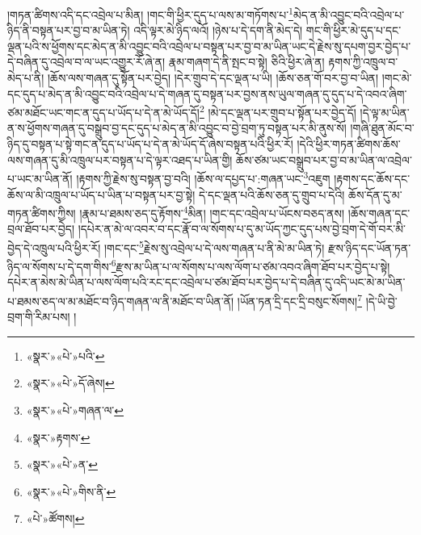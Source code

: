 །གཏན་ཚིགས་འདི་དང་འབྲེལ་པ་མིན། །གང་གི་ཕྱིར་དུད་པ་ལས་མ་གཏོགས་པ་\footnote{«སྣར་»«པེ་»པའི་}མེད་ན་མི་འབྱུང་བའི་འབྲེལ་པ་ཉིད་ནི་བསྟན་པར་བྱ་བ་མ་ཡིན་ཏེ། འདི་ལྟར་མེ་ཉིད་ལའོ། །ཉེས་པ་དེ་དག་ནི་མེད་དེ། གང་གི་ཕྱིར་མེ་དུད་པ་དང་ལྡན་པའི་ས་ཕྱོགས་དང་མེད་ན་མི་འབྱུང་བའི་འབྲེལ་པ་བསྟན་པར་བྱ་བ་མ་ཡིན་ཡང་དེ་རྗེས་སུ་དཔག་བྱར་བྱེད་པ་དེ་བཞིན་དུ་འབྲེལ་བ་ལ་ཡང་འགྱུར་རོ་ཞེ་ན། རྣམ་གཞག་དེ་ནི་སྤང་བ་སྟེ། ཅིའི་ཕྱིར་ཞེ་ན། རྟགས་ཀྱི་འཁྲུལ་བ་མེད་པ་ནི། །ཆོས་ལས་གཞན་དུ་སྟོན་པར་བྱེད། །དེར་གྲུབ་དེ་དང་ལྡན་པ་ཡི། །ཆོས་ཅན་གོ་བར་བྱ་བ་ཡིན། །གང་མེ་དང་དུད་པ་མེད་ན་མི་འབྱུང་བའི་འབྲེལ་པ་དེ་གཞན་དུ་བསྟན་པར་བྱས་ནས་ཡུལ་གཞན་དུ་དུད་པ་དེ་འབའ་ཞིག་ཙམ་མཐོང་ཡང་གང་ན་དུད་པ་ཡོད་པ་དེ་ན་མེ་ཡོད་དོ།\footnote{«སྣར་»«པེ་»དོ་ཞེས།} །མེ་དང་ལྡན་པར་གྲུབ་པ་སྟོན་པར་བྱེད་དོ། །དེ་ལྟ་མ་ཡིན་ན་ས་ཕྱོགས་གཞན་དུ་བསྒྲུབ་བྱ་དང་དུད་པ་མེད་ན་མི་འབྱུང་བ་བྱེ་བྲག་ཏུ་བསྟན་པར་མི་ནུས་སོ། །གཞི་ཐུན་མོང་བ་ཉིད་དུ་བསྟན་པ་སྟེ་གང་ན་དུད་པ་ཡོད་པ་དེ་ན་མེ་ཡོད་དོ་ཞེས་བསྟན་པའི་ཕྱིར་རོ། །དེའི་ཕྱིར་གཏན་ཚིགས་ཆོས་ལས་གཞན་དུ་མི་འཁྲུལ་པར་བསྟན་པ་དེ་ལྟར་འཐད་པ་ཡིན་གྱི། ཆོས་ཙམ་ཡང་བསྒྲུབ་པར་བྱ་བ་མ་ཡིན་ལ་འབྲེལ་པ་ཡང་མ་ཡིན་ནོ། །རྟགས་ཀྱི་རྗེས་སུ་བསྟན་བྱ་བའི། །ཆོས་ལ་དཔྱད་པ་:གཞན་ཡང་\footnote{«སྣར་»«པེ་»གཞན་ལ་}འཇུག །རྟགས་དང་ཆོས་དང་ཆོས་ལ་མི་འཁྲུལ་པ་ཡོད་པ་ཡིན་པ་བསྟན་པར་བྱ་སྟེ། དེ་དང་ལྡན་པའི་ཆོས་ཅན་དུ་གྲུབ་པ་དེའི། ཆོས་དོན་དུ་མ་གཏན་ཚིགས་ཀྱིས། །རྣམ་པ་ཐམས་ཅད་དུ་རྟོགས་\footnote{«སྣར་»རྟགས་}མིན། །གང་དང་འབྲེལ་པ་ཡོངས་བཅད་ནས། །ཆོས་གཞན་དང་བྲལ་ཐོབ་པར་བྱེད། །དཔེར་ན་མེ་ལ་འབར་བ་དང་རྣོ་བ་ལ་སོགས་པ་དུ་མ་ཡོད་ཀྱང་དུད་པས་བྱེ་བྲག་དེ་གོ་བར་མི་བྱེད་དེ་འཁྲུལ་པའི་ཕྱིར་རོ། །གང་དང་\footnote{«སྣར་»«པེ་»ན་}རྗེས་སུ་འབྲེལ་པ་དེ་ལས་གཞན་པ་ནི་མེ་མ་ཡིན་ཏེ། རྫས་ཉིད་དང་ཡོན་ཏན་ཉིད་ལ་སོགས་པ་དེ་དག་གིས་\footnote{«སྣར་»«པེ་»གིས་ནི་}རྫས་མ་ཡིན་པ་ལ་སོགས་པ་ལས་ལོག་པ་ཙམ་འབའ་ཞིག་ཐོབ་པར་བྱེད་པ་སྟེ། དཔེར་ན་མེས་མེ་ཡིན་པ་ལས་ལོག་པའི་རང་དང་འབྲེལ་པ་ཙམ་ཐོབ་པར་བྱེད་པ་དེ་བཞིན་དུ་འདི་ཡང་མེ་མ་ཡིན་པ་ཐམས་ཅད་ལ་མ་མཐོང་བ་ཉིད་གཞན་ལ་ནི་མཐོང་བ་ཡིན་ནོ། །ཡོན་ཏན་དྲི་དང་དྲི་བསུང་སོགས།\footnote{«པེ་»ཚོགས།} །དེ་ཡི་བྱེ་བྲག་གི་རིམ་པས། །
